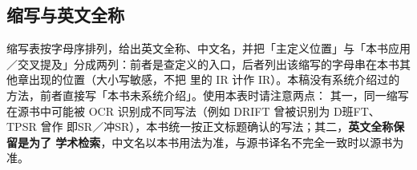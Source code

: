 %
%


\subsection{缩写与英文全称}

缩写表按字母序排列，给出英文全称、中文名，并把「主定义位置」与「本书应用／交叉提及」分成两列：前者是查定义的入口，后者列出该缩写的字母串在本书其他章出现的位置（大小写敏感，不把  里的 IR 计作 IR）。本稿没有系统介绍过的方法，前者直接写「本书未系统介绍」。使用本表时请注意两点：
其一，同一缩写在源书中可能被 OCR 识别成不同写法（例如 DRIFT 曾被识别为 D班FT、
TPSR 曾作 即SR／冲SR），本书统一按正文标题确认的写法；其二，\textbf{英文全称保留是为了
学术检索}，中文名以本书用法为准，与源书译名不完全一致时以源书为准。

